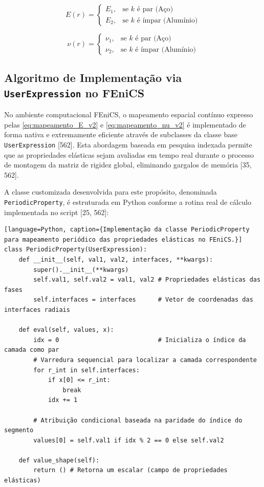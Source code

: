 \begin{equation}
  E(r) = \begin{cases} 
    E_1, & \text{se } k \text{ é par (Aço)} \\ 
    E_2, & \text{se } k \text{ é ímpar (Alumínio)} 
  \end{cases}
  \label{eq:mapeamento_E_v2}
\end{equation}

\begin{equation}
  \nu(r) = \begin{cases} 
    \nu_1, & \text{se } k \text{ é par (Aço)} \\ 
    \nu_2, & \text{se } k \text{ é ímpar (Alumínio)} 
  \end{cases}
  \label{eq:mapeamento_nu_v2}
\end{equation}

\subsection{Algoritmo de Implementação via \texttt{UserExpression} no FEniCS}

No ambiente computacional FEniCS, o mapeamento espacial contínuo expresso pelas \eqref{eq:mapeamento_E_v2} e \eqref{eq:mapeamento_nu_v2} é implementado de forma nativa e extremamente eficiente através de subclasses da classe base \texttt{UserExpression} [562]. Esta abordagem baseada em pesquisa indexada permite que as propriedades elásticas sejam avaliadas em tempo real durante o processo de montagem da matriz de rigidez global, eliminando gargalos de memória [35, 562].

A classe customizada desenvolvida para este propósito, denominada \texttt{PeriodicProperty}, é estruturada em Python conforme a rotina real de cálculo implementada no script [25, 562]:

\begin{verbatim}[language=Python, caption={Implementação da classe PeriodicProperty para mapeamento periódico das propriedades elásticas no FEniCS.}]
class PeriodicProperty(UserExpression):
    def __init__(self, val1, val2, interfaces, **kwargs):
        super().__init__(**kwargs)
        self.val1, self.val2 = val1, val2 # Propriedades elásticas das fases
        self.interfaces = interfaces      # Vetor de coordenadas das interfaces radiais

    def eval(self, values, x):
        idx = 0                           # Inicializa o índice da camada como par
        # Varredura sequencial para localizar a camada correspondente
        for r_int in self.interfaces:
            if x[0] <= r_int:
                break
            idx += 1

        # Atribuição condicional baseada na paridade do índice do segmento
        values[0] = self.val1 if idx % 2 == 0 else self.val2

    def value_shape(self):
        return () # Retorna um escalar (campo de propriedades elásticas)
\end{verbatim}

